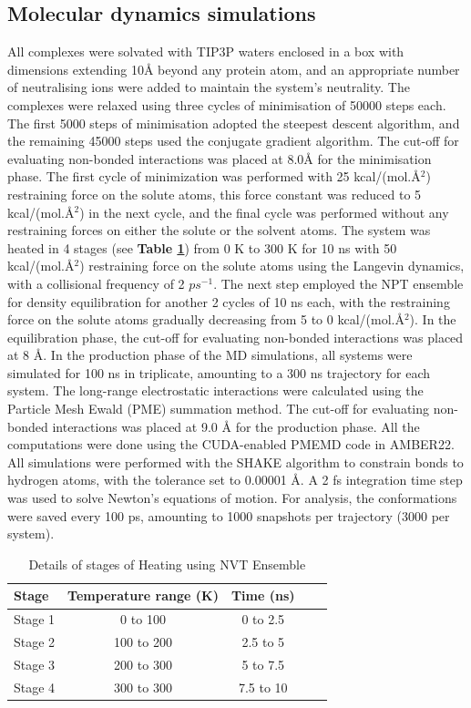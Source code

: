 \documentclass[12pt, a4paper]{achemso}
\begin{document}
\subsection{Molecular dynamics simulations} 
 All complexes were solvated with TIP3P\cite{tip3p} waters enclosed in a box with dimensions extending 10\r{A} beyond any protein atom,  and an appropriate number of neutralising ions were added to maintain the system's neutrality.  The complexes were relaxed using three cycles of minimisation of 50000 steps each.  The first 5000 steps of minimisation adopted the steepest descent algorithm, and the remaining 45000 steps used the conjugate gradient algorithm.  The cut-off for evaluating non-bonded interactions was placed at 8.0\r{A} for the minimisation phase.  The first cycle of minimization was performed with  25 kcal/(mol.{\r{A}$^2$}) restraining force on the solute atoms, this force constant was reduced to 5 kcal/(mol.\r{A}$^2$)  in the next cycle, and the final cycle was performed without any restraining forces on either the solute or the solvent atoms.  The system was heated in 4 stages (see \textbf{Table \ref{tbl: Heating using NVT Ensemble}}) from 0 K to 300 K for 10 ns with  50 kcal/(mol.{\r{A}$^2$}) restraining force on the solute atoms using the Langevin dynamics, with a collisional frequency of  2 $ps^{-1}$.  The next step employed the NPT ensemble for density equilibration for another 2 cycles of 10 ns each, with the restraining force on the solute atoms gradually decreasing from 5 to 0 kcal/(mol.{\r{A}$^2$}).  In the equilibration phase, the cut-off for evaluating non-bonded interactions was placed at 8 {\r{A}}.  In the production phase of the MD simulations, all systems were simulated for 100 ns in triplicate, amounting to a 300 ns trajectory for each system.  The long-range electrostatic interactions were calculated using the Particle Mesh Ewald (PME) summation method\cite{pme}. The cut-off for evaluating non-bonded interactions was placed at 9.0 {\r{A}}  for the production phase. All the computations were done using the CUDA-enabled PMEMD code\cite{pmemd01, pmemd02, pmemd03} in AMBER22\cite{amber22, amber}.  
All simulations were performed with the SHAKE algorithm\cite{shake} to constrain bonds to hydrogen atoms, with the tolerance set to 0.00001 {\AA}.  A 2 fs integration time step was used to solve Newton's equations of motion.  For analysis, the conformations were saved every 100 ps, amounting to 1000 snapshots per trajectory (3000 per system). 

\begin{table}
  \caption{Details of stages of Heating using NVT Ensemble}
  \label{tbl: Heating using NVT Ensemble}
  \begin{tabular}{lcccc}
    \hline
   \textbf{Stage}  & \textbf{Temperature range (K)} & \textbf{Time (ns)} \\
    \hline
    Stage 1 & 0 to 100 & 0 to 2.5 \\
    Stage 2 & 100 to 200 & 2.5 to 5 \\
    Stage 3 & 200 to 300 & 5 to 7.5 \\
    Stage 4 & 300 to 300 & 7.5 to 10 \\ 
    \hline
  \end{tabular}
\end{table}
\end{document}

